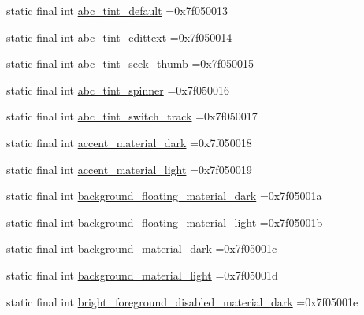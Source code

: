 \begin{DoxyCompactItemize}
\item 
static final int \mbox{\hyperlink{classbr_1_1unb_1_1cic_1_1mp_1_1marketmaster_1_1R_1_1color_a3263bda26c8f75799b9829d8737323d8}{abc\+\_\+tint\+\_\+default}} =0x7f050013
\item 
static final int \mbox{\hyperlink{classbr_1_1unb_1_1cic_1_1mp_1_1marketmaster_1_1R_1_1color_a3353e7040bea188054e299b70e85f553}{abc\+\_\+tint\+\_\+edittext}} =0x7f050014
\item 
static final int \mbox{\hyperlink{classbr_1_1unb_1_1cic_1_1mp_1_1marketmaster_1_1R_1_1color_a223085f72db465593190528e01425ed5}{abc\+\_\+tint\+\_\+seek\+\_\+thumb}} =0x7f050015
\item 
static final int \mbox{\hyperlink{classbr_1_1unb_1_1cic_1_1mp_1_1marketmaster_1_1R_1_1color_ae5551673220198f29959696933ccb92e}{abc\+\_\+tint\+\_\+spinner}} =0x7f050016
\item 
static final int \mbox{\hyperlink{classbr_1_1unb_1_1cic_1_1mp_1_1marketmaster_1_1R_1_1color_a918ecfdc17dddb89e5eaa5ccc168fd22}{abc\+\_\+tint\+\_\+switch\+\_\+track}} =0x7f050017
\item 
static final int \mbox{\hyperlink{classbr_1_1unb_1_1cic_1_1mp_1_1marketmaster_1_1R_1_1color_a7f6ee9d4ad4bd5e3e39e39fc3c6ff772}{accent\+\_\+material\+\_\+dark}} =0x7f050018
\item 
static final int \mbox{\hyperlink{classbr_1_1unb_1_1cic_1_1mp_1_1marketmaster_1_1R_1_1color_aece57986334bbe1fefdde1ddacfa678e}{accent\+\_\+material\+\_\+light}} =0x7f050019
\item 
static final int \mbox{\hyperlink{classbr_1_1unb_1_1cic_1_1mp_1_1marketmaster_1_1R_1_1color_a838fe4aaae09d224796bd69489628c9b}{background\+\_\+floating\+\_\+material\+\_\+dark}} =0x7f05001a
\item 
static final int \mbox{\hyperlink{classbr_1_1unb_1_1cic_1_1mp_1_1marketmaster_1_1R_1_1color_af8d53eafb7e44e7d9a68066915fefa7f}{background\+\_\+floating\+\_\+material\+\_\+light}} =0x7f05001b
\item 
static final int \mbox{\hyperlink{classbr_1_1unb_1_1cic_1_1mp_1_1marketmaster_1_1R_1_1color_ad3e177fc80f20bc01d9b56ad0729b369}{background\+\_\+material\+\_\+dark}} =0x7f05001c
\item 
static final int \mbox{\hyperlink{classbr_1_1unb_1_1cic_1_1mp_1_1marketmaster_1_1R_1_1color_a31914faf029c69e1bab7a94806928166}{background\+\_\+material\+\_\+light}} =0x7f05001d
\item 
static final int \mbox{\hyperlink{classbr_1_1unb_1_1cic_1_1mp_1_1marketmaster_1_1R_1_1color_a23d9101b6ac6367e10b5c80843e898b2}{bright\+\_\+foreground\+\_\+disabled\+\_\+material\+\_\+dark}} =0x7f05001e

\end{DoxyCompactItemize}
